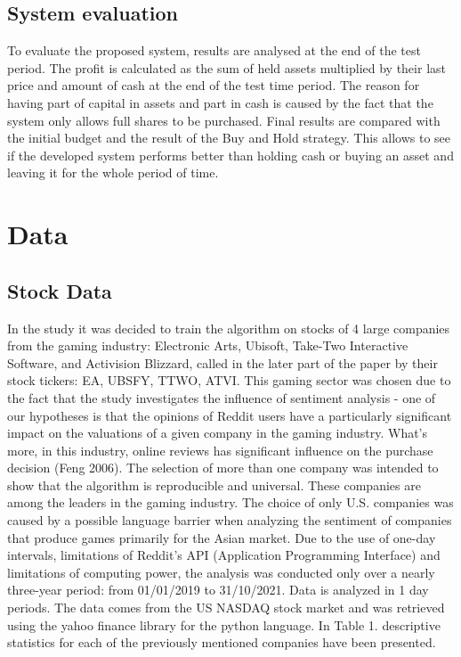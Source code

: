 \documentclass[review]{elsarticle} %
\begin{document}
\subsection{System evaluation}
To evaluate the proposed system, results are analysed at the end of the test period. The profit is calculated as the sum of held assets multiplied by their last price and amount of cash at the end of the test time period. The reason for having part of capital in assets and part in cash is caused by the fact that the  system only allows full shares to be purchased. Final results are compared with the initial budget and the result of the Buy and Hold strategy. This allows to see if the developed system performs better than holding cash or buying an asset and leaving it for the whole period of time. 

\section{Data}
\subsection{Stock Data}
In the study it was decided to train the algorithm on stocks of 4 large companies from the gaming industry: Electronic Arts, Ubisoft, Take-Two Interactive Software, and Activision Blizzard, called in the later part of the paper by their stock tickers: EA, UBSFY, TTWO, ATVI. This gaming sector was chosen due to the fact that the study investigates the influence of sentiment analysis - one of our hypotheses is that the opinions of Reddit users have a particularly significant impact on the valuations of a given company in the gaming industry. What's more, in this industry, online reviews has significant influence on the purchase decision (Feng 2006). The selection of more than one company was intended to show that the algorithm is reproducible and universal. These companies are among the leaders in the gaming industry. The choice of only U.S. companies was caused by a possible language barrier when analyzing the sentiment of companies that produce games primarily for the Asian market. Due to the use of one-day intervals, limitations of Reddit's API (Application Programming Interface) and limitations of computing power, the analysis was conducted only over a nearly three-year period: from 01/01/2019 to 31/10/2021. Data is analyzed in 1 day periods. The data comes from the US NASDAQ stock market and was retrieved using the yahoo finance library for the python language. In Table 1. descriptive statistics for each of the previously mentioned companies have been presented. 
\end{document}
